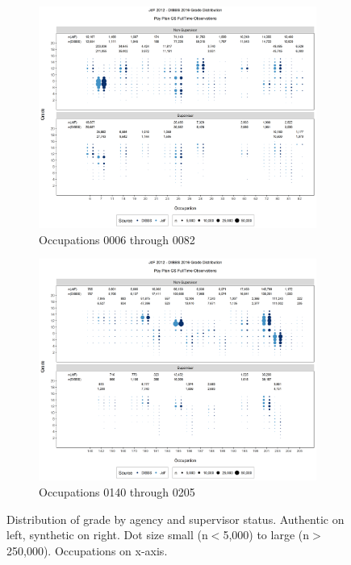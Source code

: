 \documentclass[10pt, letterpaper]{article}
\begin{document}
\begin{spacing}{1.0}
\clearpage

\begin{figure}[]
    \centering
    \begin{subfigure}{1\textwidth}
        \centering
        \includegraphics[width=6in, trim={0 200px 0 165px}, clip]{JdFDIBBSGSFullTimeGradeSupervisoryStatusOccupation1.png}
        \caption{Occupations 0006 through 0082}
        \vspace{20pt}
    \end{subfigure}
    \begin{subfigure}{1\textwidth}
        \centering
        \includegraphics[width=6in, trim={0 200px 0 165px}, clip]{JdFDIBBSGSFullTimeGradeSupervisoryStatusOccupation41.png}
        \caption{Occupations 0140 through 0205}
        \vspace{10pt}
    \end{subfigure}
    \caption{Distribution of grade by agency and supervisor status.  Authentic on left, synthetic on right.  Dot size small (n$<$5,000) to large (n$>$250,000).  Occupations on x-axis.}
    \label{figure:JdFDIBBSGSFullTimeGradeSupervisoryStatusOccupation}
\end{figure}


\end{spacing}
\end{document}

